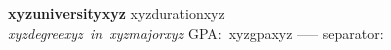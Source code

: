\textbf{xyzuniversityxyz} \hfill xyzdurationxyz\\
\textit{xyzdegreexyz\ in\ xyzmajorxyz} \hfill GPA:\ xyzgpaxyz
-----
separator: \vspace{4pt}
